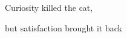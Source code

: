 \vspace{17cm}

\begin{flushright}
\Large
\itshape{Curiosity killed the cat,
	
	but satisfaction brought it back}
\end{flushright}
